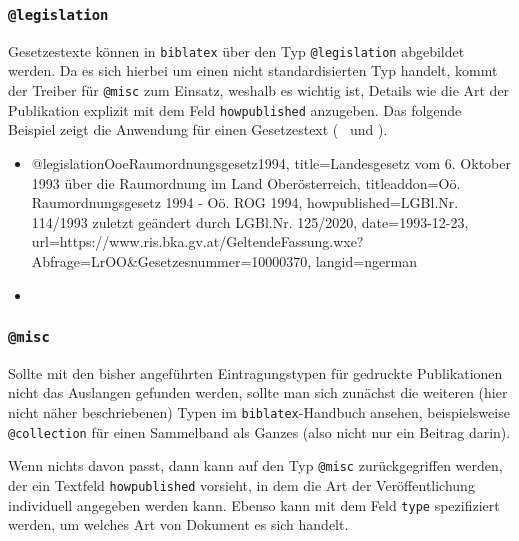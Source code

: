 \subsubsection{\texttt{\bfseries @legislation}}
\label{sec:@legislation}

Gesetzestexte können in \texttt{biblatex} über den Typ \texttt{@legislation} abgebildet werden. Da es sich hierbei
um einen nicht standardisierten Typ handelt, kommt der Treiber für \texttt{@misc} zum Einsatz, weshalb es wichtig
ist, Details wie die Art der Publikation explizit mit dem Feld \texttt{howpublished} anzugeben.
Das folgende Beispiel zeigt die Anwendung für einen Gesetzestext (\sa\ \cite{FhStG1993} und \cite{EuRichtlinie2000}).
%
\begin{itemize}
\item[]
\begin{GenericCode}[numbers=none]
@legislation{OoeRaumordnungsgesetz1994,
  title={Landesgesetz vom 6. Oktober 1993 über die Raumordnung im Land Oberösterreich},
  titleaddon={Oö. Raumordnungsgesetz 1994 - Oö. ROG 1994},
  howpublished={LGBl.Nr. 114/1993 zuletzt geändert durch LGBl.Nr. 125/2020},
  date={1993-12-23},
  url={https://www.ris.bka.gv.at/GeltendeFassung.wxe?Abfrage=LrOO&Gesetzesnummer=10000370},
  langid={ngerman}
}
\end{GenericCode}
\item[\cite{OoeRaumordnungsgesetz1994}] 
\end{itemize}
%



\subsubsection{\texttt{\bfseries @misc}}
\label{sec:@misc}

Sollte mit den bisher angeführten Eintragungstypen für gedruckte Publikationen nicht das Auslangen gefunden werden,
sollte man sich zunächst die weiteren (hier nicht näher beschriebenen) Typen im \texttt{biblatex}-Handbuch
\cite{Kime2020} ansehen, beispielsweise \texttt{@collection} für einen Sammelband als Ganzes (also nicht nur ein
Beitrag darin).

Wenn nichts davon passt, dann kann auf den Typ \texttt{@misc} zurückgegriffen werden, der ein Textfeld
\texttt{howpublished} vorsieht, in dem die Art der Veröffentlichung individuell angegeben werden kann. Ebenso kann
mit dem Feld \texttt{type} spezifiziert werden, um welches Art von Dokument es sich handelt.


